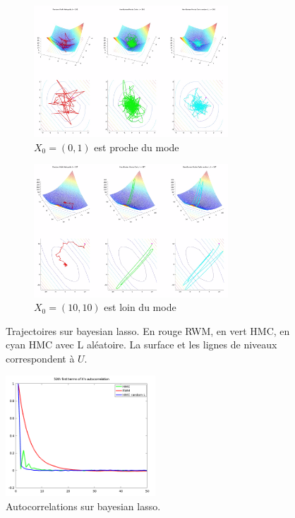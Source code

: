 \documentclass[10pt,a4paper]{article}
\begin{document}
\begin{figure}[hp]
  \begin{subfigure}{\textwidth}  
    \centering
    \includegraphics[width=0.8\textwidth]{figs/bl.png}
    \caption{$X_0 = (0,1)$ est proche du mode}  
  \end{subfigure}

  \begin{subfigure}{\textwidth}  
    \centering
    \includegraphics[width=0.8\textwidth]{figs/bl_far.png}
    \caption{$X_0 = (10, 10)$ est loin du mode}  
  \end{subfigure}
  \caption{Trajectoires sur bayesian lasso. En rouge RWM, en vert HMC, en cyan HMC avec L aléatoire. La surface et les lignes de niveaux correspondent à $U$. \label{fig:bl}}
\end{figure}

\begin{figure}[ht]
  \centering
  \includegraphics[width=0.5\textwidth]{figs/bl_autocor.png}
  \caption{Autocorrelations sur bayesian lasso. \label{fig:bl_autocor}}
\end{figure}
\end{document}
